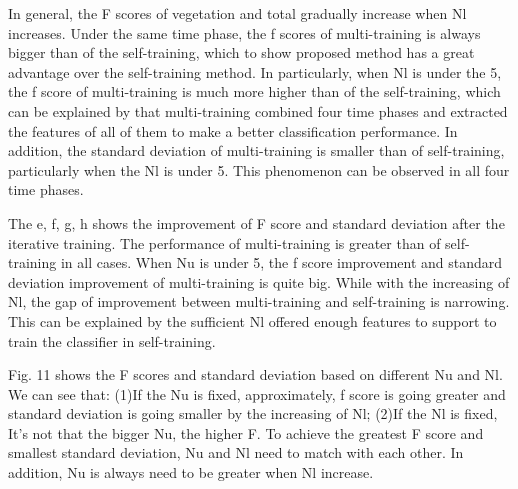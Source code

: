 \documentclass{isprs} %
\begin{document}
In general, the F scores of vegetation and total gradually increase when Nl increases. Under the same time phase, the f scores of multi-training is always bigger than of the self-training, which to show proposed method has a great advantage over the self-training method. In particularly, when Nl is under the 5, the f score of multi-training is much more higher than of the self-training, which can be explained by that multi-training combined four time phases and extracted the features of all of them to make a better classification performance. In addition, the standard deviation of multi-training is smaller than of self-training, particularly when the Nl is under 5. This phenomenon can be observed in all four time phases.

The e, f, g, h shows the improvement of F score and standard deviation after the iterative training. The performance of multi-training is greater than of self-training in all cases. When Nu is under 5, the f score improvement and standard deviation improvement of multi-training is quite big. While with the increasing of Nl, the gap of  improvement between multi-training and self-training is narrowing. This can be explained by the sufficient Nl offered enough features to support to train the classifier in self-training. 

Fig. 11 shows the F scores and standard deviation based on different Nu and Nl. We can see that: (1)If the Nu is fixed, approximately, f score is going greater and standard deviation is going smaller by the increasing of Nl; (2)If the Nl is fixed, It's not that the bigger Nu, the higher F. To achieve the greatest F score and smallest standard deviation, Nu and Nl need to match with each other. In addition, Nu is always need to be greater when Nl increase. 
\end{document}
